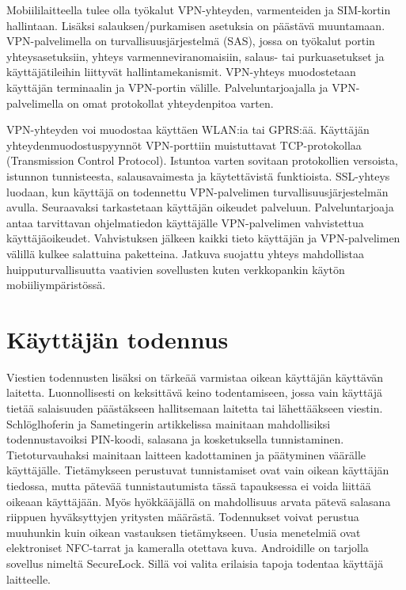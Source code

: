 \documentclass[finnish]{tktltiki2}
\theoremstyle{definition}
\theoremstyle{remark}
\begin{document}
Mobiililaitteella tulee olla työkalut VPN-yhteyden, varmenteiden ja SIM-kortin hallintaan. Lisäksi salauksen/purkamisen asetuksia on päästävä muuntamaan. VPN-palvelimella on turvallisuusjärjestelmä (SAS), jossa on työkalut portin yhteysasetuksiin, yhteys varmenneviranomaisiin, salaus- tai purkuasetukset ja käyttäjätileihin liittyvät hallintamekanismit. VPN-yhteys muodostetaan käyttäjän terminaalin ja  VPN-portin välille. Palveluntarjoajalla ja VPN-palvelimella on omat protokollat yhteydenpitoa varten.

VPN-yhteyden voi muodostaa käyttäen WLAN:ia tai GPRS:ää. Käyttäjän yhteydenmuodostuspyynnöt VPN-porttiin muistuttavat TCP-protokollaa (Transmission Control Protocol). Istuntoa varten sovitaan protokollien versoista, istunnon tunnisteesta, salausavaimesta ja käytettävistä funktioista. SSL-yhteys luodaan, kun käyttäjä on todennettu VPN-palvelimen turvallisuusjärjestelmän avulla. Seuraavaksi tarkastetaan käyttäjän oikeudet palveluun. Palveluntarjoaja antaa tarvittavan ohjelmatiedon käyttäjälle VPN-palvelimen vahvistettua käyttäjäoikeudet. Vahvistuksen jälkeen kaikki tieto käyttäjän ja VPN-palvelimen välillä kulkee salattuina paketteina. Jatkuva suojattu yhteys mahdollistaa huipputurvallisuutta vaativien sovellusten kuten verkkopankin käytön mobiiliympäristössä. \cite{vpn}

\section{Käyttäjän todennus}

Viestien todennusten lisäksi on tärkeää varmistaa oikean käyttäjän käyttävän laitetta. Luonnollisesti on keksittävä keino todentamiseen, jossa vain käyttäjä tietää salaisuuden päästäkseen hallitsemaan laitetta tai lähettääkseen viestin. Schlöglhoferin ja Sametingerin \cite{secure} artikkelissa mainitaan mahdollisiksi todennustavoiksi PIN-koodi, salasana ja kosketuksella tunnistaminen. Tietoturvauhaksi mainitaan laitteen kadottaminen ja päätyminen väärälle käyttäjälle. Tietämykseen perustuvat tunnistamiset ovat vain oikean käyttäjän tiedossa, mutta pätevää tunnistautumista tässä tapauksessa ei voida liittää oikeaan käyttäjään. Myös hyökkääjällä on mahdollisuus arvata pätevä salasana riippuen hyväksyttyjen yritysten määrästä. Todennukset voivat perustua muuhunkin kuin oikean vastauksen tietämykseen. Uusia menetelmiä ovat elektroniset NFC-tarrat ja kameralla otettava kuva. Androidille on tarjolla sovellus nimeltä SecureLock. Sillä voi valita erilaisia tapoja todentaa käyttäjä laitteelle. 
\end{document}
